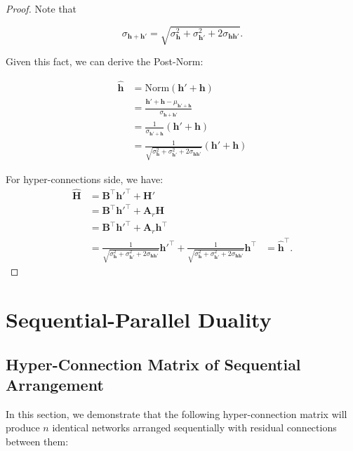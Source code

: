 \begin{proof}
Note that

\begin{equation}
\sigma_{\mathbf{h} + \mathbf{h}'} = \sqrt{\sigma_{\mathbf{h}}^2 + \sigma_{\mathbf{h}'}^2 + 2\sigma_{\mathbf{h}\mathbf{h}'}}.
\end{equation}

Given this fact, we can derive the Post-Norm:

\begin{equation}
\begin{aligned}
     \mathbf{\hat{h}} &= \text{Norm}(\mathbf{h}' + \mathbf{h}) \\
    &= \frac{\mathbf{h}' + \mathbf{h} - \mu_{\mathbf{h}' + \mathbf{h}}}{\sigma_{\mathbf{h} + \mathbf{h}'}} \\
    &= \frac{1}{\sigma_{\mathbf{h}' + \mathbf{h}}} (\mathbf{h}' + \mathbf{h}) \\
    &= \frac{1}{\sqrt{\sigma_{\mathbf{h}}^2 + \sigma_{\mathbf{h}'}^2 + 2\sigma_{\mathbf{h}\mathbf{h}'}}} (\mathbf{h}' + \mathbf{h})
\end{aligned}
\end{equation}

For hyper-connections side, we have:
\begin{equation}
\begin{aligned}
    \mathbf{\hat{H}} &= \mathbf{B}^\intercal \mathbf{h}'^\intercal + \mathbf{H}' \\
    &= \mathbf{B}^\intercal \mathbf{h}'^\intercal + \mathbf{A}_r \mathbf{H} \\
    &= \mathbf{B}^\intercal \mathbf{h}'^\intercal + \mathbf{A}_r \mathbf{h}^\intercal \\
    &= \frac{1}{\sqrt{\sigma_{\mathbf{h}}^2 + \sigma_{\mathbf{h}'}^2 + 2\sigma_{\mathbf{h}\mathbf{h}'}}} \mathbf{h}'^\intercal + 
    \frac{1}{\sqrt{\sigma_{\mathbf{h}}^2 + \sigma_{\mathbf{h}'}^2 + 2\sigma_{\mathbf{h}\mathbf{h}'}}} \mathbf{h}^\intercal
    &= \mathbf{\hat{h}}^\intercal.
\end{aligned}
\end{equation}

\end{proof}


\newpage
\section{Sequential-Parallel Duality}
\label{app:spd}
\subsection{Hyper-Connection Matrix of Sequential Arrangement}
In this section, we demonstrate that the following hyper-connection matrix will produce $n$ identical networks arranged sequentially with residual connections between them:

